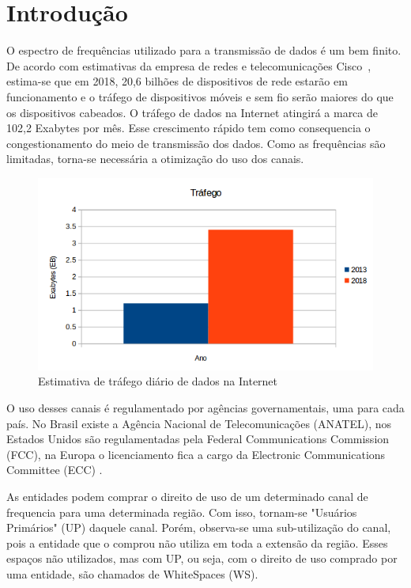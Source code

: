 \chapter{Introdução}

O espectro de frequências utilizado para a transmissão de dados é um bem finito. De acordo com estimativas da empresa de redes e telecomunicações Cisco~\cite{ciscoforecast}, estima-se que em 2018, 20,6 bilhões de dispositivos de rede estarão em funcionamento e o tráfego de dispositivos móveis e sem fio serão maiores do que os dispositivos cabeados. O tráfego de dados na Internet atingirá a marca de 102,2 Exabytes por mês. Esse crescimento rápido tem como consequencia o congestionamento do meio de transmissão dos dados. Como as frequências são limitadas, torna-se necessária a otimização do uso dos canais.

\begin{figure}[htb]
\centering
\includegraphics[width=1.0\textwidth]{figs/internet_traffic}
\caption[Estimativa de tráfego diário de dados na Internet]
{Estimativa de tráfego diário de dados na Internet}
\label{fig:trafegodiariointernet}
\end{figure} 

O uso desses canais é regulamentado por agências governamentais, uma para cada país. No Brasil existe a Agência Nacional de Telecomunicações (ANATEL),
nos Estados Unidos são regulamentadas pela Federal Communications Commission (FCC),
na Europa o licenciamento fica a cargo da Electronic Communications Committee (ECC)
.

As entidades podem comprar o direito de uso de um determinado canal de frequencia para uma determinada região. Com isso, tornam-se "Usuários Primários" (UP)  daquele canal. Porém, observa-se uma sub-utilização do canal, pois a entidade que o comprou não utiliza em toda a extensão da região. Esses espaços não utilizados, mas com UP, ou seja, com o direito de uso comprado por uma entidade, são chamados de WhiteSpaces (WS).
  
